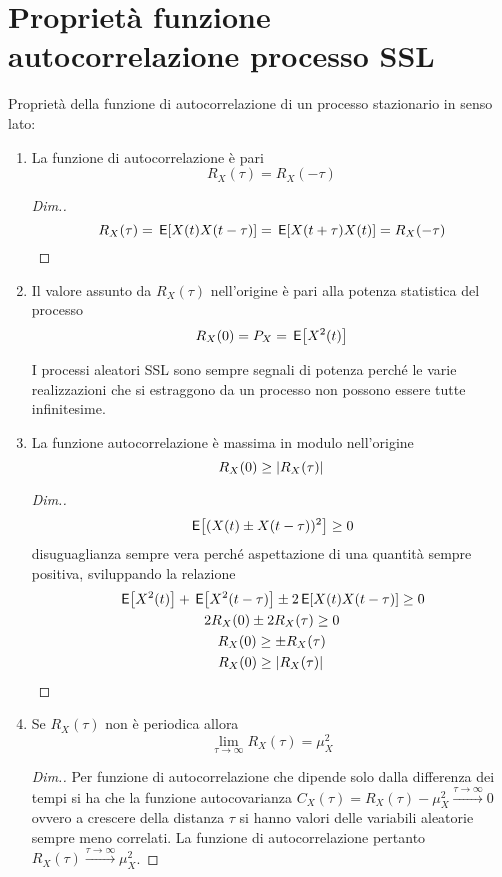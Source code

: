 \section{Proprietà funzione autocorrelazione processo SSL}
Proprietà della funzione di autocorrelazione di un processo stazionario in senso lato:
\begin{enumerate}
\item La funzione di autocorrelazione è pari
\[
	R_X(\tau)=R_X(-\tau)
\]
\begin{proof}[Dim.]
\[
	R_X(\tau)=\,{\operatorname{\mathsf{E}}}\!\left[{X(t)X(t-\tau)}\right]=\,{\operatorname{\mathsf{E}}}\!\left[{X(t+\tau)X(t)}\right]=R_X(-\tau)
\qedhere
\]
\end{proof}

\item Il valore assunto da $R_X(\tau)$ nell'origine è pari alla potenza statistica del processo
\[
	R_X(0)=P_X=\,{\operatorname{\mathsf{E}}}\!\left[{X^2(t)}\right]
\]
\begin{nota}
	I processi aleatori SSL sono sempre segnali di potenza perché le varie realizzazioni che si estraggono da un processo non possono essere tutte infinitesime.
\end{nota}

\item La funzione autocorrelazione è massima in modulo nell'origine
\[
	R_X(0)\geq\left|{R_X(\tau)}\right|
\]

\begin{proof}[Dim.]
\[
	\,{\operatorname{\mathsf{E}}}\!\left[{(X(t)\pm X(t-\tau))^2}\right]\geq 0
\]
disuguaglianza sempre vera perché aspettazione di una quantità sempre positiva, sviluppando la relazione
\begin{gather*}
\,{\operatorname{\mathsf{E}}}\!\left[{X^2(t)}\right]+\,{\operatorname{\mathsf{E}}}\!\left[{X^2(t-\tau)}\right]\pm 2 \,{\operatorname{\mathsf{E}}}\!\left[{X(t)X(t-\tau)}\right]\geq 0\\
2R_X(0)\pm 2R_X(\tau)\geq 0\\
R_X(0)\geq\pm R_X(\tau)\\
R_X(0)\geq\left|{R_X(\tau)}\right|
\qedhere
\end{gather*}
\end{proof}

\item Se $R_X(\tau)$ non è periodica allora \begin{equation}
	\lim\limits_{\tau\to\infty}R_X(\tau)=\mu^2_X
\end{equation}
\begin{proof}[Dim.]
Per funzione di autocorrelazione che dipende solo dalla differenza dei tempi si ha che la funzione autocovarianza $C_X(\tau)=R_X(\tau)-\mu^2_X\xrightarrow{\tau\to\infty}0$ ovvero a crescere della distanza $\tau$ si hanno valori delle variabili aleatorie sempre meno correlati. La funzione di autocorrelazione pertanto $R_X(\tau)\xrightarrow{\tau\to\infty}\mu^2_X$.
\end{proof}
\end{enumerate}

